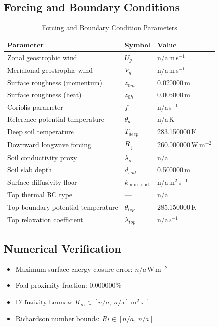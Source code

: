 \subsection{Forcing and Boundary Conditions}
\begin{table}[htbp]
\centering
\caption{Forcing and Boundary Condition Parameters}
\label{tab:scm_parameters_cases99_scm_case_report}
\begin{tabular}{lll}
\hline
{\bfseries Parameter} & {\bfseries Symbol} & {\bfseries Value} \\
\hline
Zonal geostrophic wind & $U_g$ & n/a\,m\,s$^{-1}$ \\
Meridional geostrophic wind & $V_g$ & n/a\,m\,s$^{-1}$ \\
Surface roughness (momentum) & $z_{0m}$ & 0.020000\,m \\
Surface roughness (heat) & $z_{0h}$ & 0.005000\,m \\
Coriolis parameter & $f$ & n/a\,s$^{-1}$ \\
Reference potential temperature & $\theta_a$ & n/a\,K \\
Deep soil temperature & $T_{deep}$ & 283.150000\,K \\
Downward longwave forcing & $R_{\downarrow}$ & 260.000000\,W\,m$^{-2}$ \\
Soil conductivity proxy & $\lambda_s$ & n/a \\
Soil slab depth & $d_{soil}$ & 0.500000\,m \\
Surface diffusivity floor & $k_{\min,\mathrm{surf}}$ & n/a\,m$^2$\,s$^{-1}$ \\
Top thermal BC type & --- & n/a \\
Top boundary potential temperature & $\theta_{top}$ & 285.150000\,K \\
Top relaxation coefficient & $\lambda_{top}$ & n/a\,s$^{-1}$ \\
\hline
\end{tabular}
\end{table}

\subsection{Numerical Verification}
\begin{itemize}
  \item Maximum surface energy closure error:
  $n/a\,\mathrm{W\,m^{-2}}$
  \item Fold-proximity fraction:
  $0.000000\%$
  \item Diffusivity bounds:
  $K_m \in [n/a,\,n/a]~\mathrm{m^2\,s^{-1}}$
  \item Richardson number bounds:
  $Ri \in [n/a,\,n/a]$
\end{itemize}

